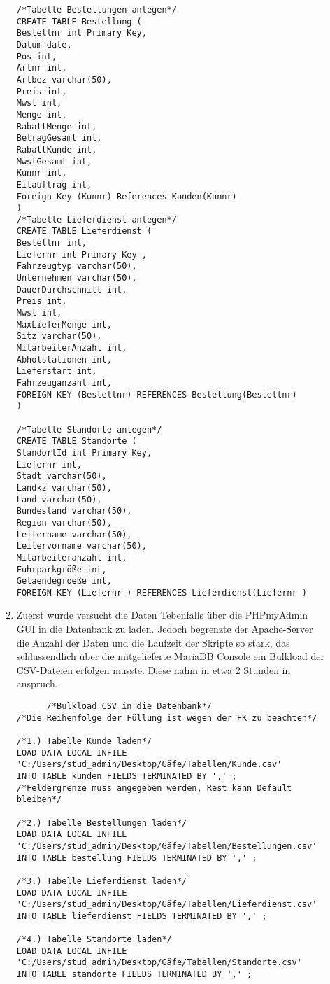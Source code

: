\documentclass[a4paper, 12pt]{scrartcl}
\begin{document}
\begin{description}
\begin{enumerate}
\begin{verbatim}
/*Tabelle Bestellungen anlegen*/
CREATE TABLE Bestellung (
Bestellnr int Primary Key,
Datum date,
Pos int,
Artnr int,
Artbez varchar(50),
Preis int,
Mwst int,
Menge int,
RabattMenge int,
BetragGesamt int,
RabattKunde int,
MwstGesamt int,
Kunnr int,
Eilauftrag int,
Foreign Key (Kunnr) References Kunden(Kunnr)
)
/*Tabelle Lieferdienst anlegen*/
CREATE TABLE Lieferdienst (
Bestellnr int,
Liefernr int Primary Key ,
Fahrzeugtyp varchar(50),
Unternehmen varchar(50),
DauerDurchschnitt int,
Preis int,
Mwst int,
MaxLieferMenge int,
Sitz varchar(50),
MitarbeiterAnzahl int,
Abholstationen int,
Lieferstart int,
Fahrzeuganzahl int,
FOREIGN KEY (Bestellnr) REFERENCES Bestellung(Bestellnr)
)

/*Tabelle Standorte anlegen*/
CREATE TABLE Standorte (
StandortId int Primary Key,
Liefernr int,
Stadt varchar(50),
Landkz varchar(50),
Land varchar(50),
Bundesland varchar(50),
Region varchar(50),
Leitername varchar(50),
Leitervorname varchar(50),
Mitarbeiteranzahl int,
Fuhrparkgröße int,
Gelaendegroeße int,
FOREIGN KEY (Liefernr ) REFERENCES Lieferdienst(Liefernr )

      \end{verbatim}
      
      \item  Zuerst wurde versucht die Daten Tebenfalls über die PHPmyAdmin GUI in die Datenbank zu laden. Jedoch begrenzte der Apache-Server die Anzahl der Daten und die Laufzeit der Skripte so stark, das schlussendlich über die mitgelieferte MariaDB Console ein Bulkload der CSV-Dateien erfolgen musste. Diese nahm in etwa 2 Stunden in anspruch.
      \begin{verbatim}
      /*Bulkload CSV in die Datenbank*/
/*Die Reihenfolge der Füllung ist wegen der FK zu beachten*/

/*1.) Tabelle Kunde laden*/
LOAD DATA LOCAL INFILE 
'C:/Users/stud_admin/Desktop/Gäfe/Tabellen/Kunde.csv'
INTO TABLE kunden FIELDS TERMINATED BY ',' ; 
/*Feldergrenze muss angegeben werden, Rest kann Default bleiben*/

/*2.) Tabelle Bestellungen laden*/
LOAD DATA LOCAL INFILE 
'C:/Users/stud_admin/Desktop/Gäfe/Tabellen/Bestellungen.csv'
INTO TABLE bestellung FIELDS TERMINATED BY ',' ;

/*3.) Tabelle Lieferdienst laden*/
LOAD DATA LOCAL INFILE 
'C:/Users/stud_admin/Desktop/Gäfe/Tabellen/Lieferdienst.csv'
INTO TABLE lieferdienst FIELDS TERMINATED BY ',' ;

/*4.) Tabelle Standorte laden*/
LOAD DATA LOCAL INFILE 
'C:/Users/stud_admin/Desktop/Gäfe/Tabellen/Standorte.csv'
INTO TABLE standorte FIELDS TERMINATED BY ',' ;
      

\end{verbatim}
\end{enumerate}
\end{description}
\end{document}
